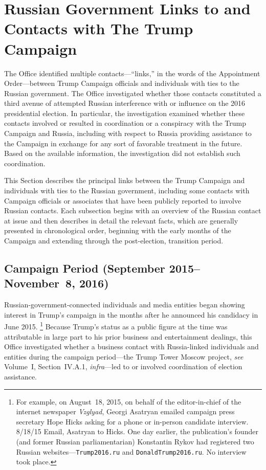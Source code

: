 \section{Russian Government Links to and Contacts with The Trump Campaign}

The Office identified multiple contacts---``links,'' in the words of the Appointment Order---between Trump Campaign officials and individuals with ties to the Russian government.
The Office investigated whether those contacts constituted a third avenue of attempted Russian interference with or influence on the 2016 presidential election.
In particular, the investigation examined whether these contacts involved or resulted in coordination or a conspiracy with the Trump Campaign and Russia, including with respect to Russia providing assistance to the Campaign in exchange for any sort of favorable treatment in the future.
Based on the available information, the investigation did not establish such coordination.

This Section describes the principal links between the Trump Campaign and individuals with ties to the Russian government, including some contacts with Campaign officials or associates that have been publicly reported to involve Russian contacts.
Each subsection begins with an overview of the Russian contact at issue and then describes in detail the relevant facts, which are generally presented in chronological order, beginning with the early months of the Campaign and extending through the post-election, transition period.

\subsection{Campaign Period (September 2015--November~8, 2016)}

Russian-government-connected individuals and media entities began showing interest in Trump's campaign in the months after he announced his candidacy in June 2015.%
\footnote{For example, on August~18, 2015, on behalf of the editor-in-chief of the internet newspaper \textit{Vzglyad}, Georgi Asatryan emailed campaign press secretary Hope Hicks asking for a phone or in-person candidate interview.
8/18/15 Email, Asatryan to Hicks.
One day earlier, the publication's founder (and former Russian parliamentarian) Konstantin Rykov had registered two Russian websites---\verb+Trump2016.ru+ and \verb+DonaldTrump2016.ru+.
No interview took place.}
Because Trump's status as a public figure at the time was attributable in large part to his prior business and entertainment dealings, this Office investigated whether a business contact with Russia-linked individuals and entities during the campaign period---the Trump Tower Moscow project, \textit{see} Volume~I, Section~IV.A.1, \textit{infra}---led to or involved coordination of election assistance.

